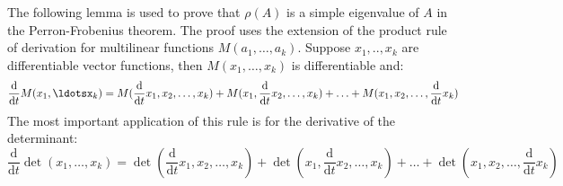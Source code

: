 \documentclass[a4paper,11pt]{report}
\begin{document}
   The following lemma is used to prove that $\rho(A)$ is a simple 
   eigenvalue of $A$ in the Perron-Frobenius theorem. The proof uses the 
   extension of the product rule of derivation for multilinear functions 
   $M(a_1,\ldots,a_k)$. Suppose $x_1,..,x_k$ are differentiable vector functions, 
   then $M(x_1,\ldots,x_k)$ is differentiable and:
   $$\frac{\mathrm{d}}{\mathrm{d}t}M(x_1,\ldotsx_k) = M(\frac{\mathrm{d}}{\mathrm{d}t} x_1, x_2, \ldots, x_k) 
   + M(x_1, \frac{\mathrm{d}}{\mathrm{d}t} x_2, \ldots, x_k) + \ldots +  M(x_1,  x_2, \ldots,\frac{\mathrm{d}}{\mathrm{d}t} x_k) $$
   The most important application of this rule is for the derivative of the determinant:
   $$\frac{\mathrm{d}}{\mathrm{d}t}\det(x_1,\ldots, x_k) = \det(\frac{\mathrm{d}}{\mathrm{d}t} x_1, x_2, \ldots, x_k) 
   + \det(x_1, \frac{\mathrm{d}}{\mathrm{d}t} x_2, \ldots, x_k) + \ldots + \det(x_1,  x_2, \ldots,\frac{\mathrm{d}}{\mathrm{d}t} x_k) $$
\end{document}
